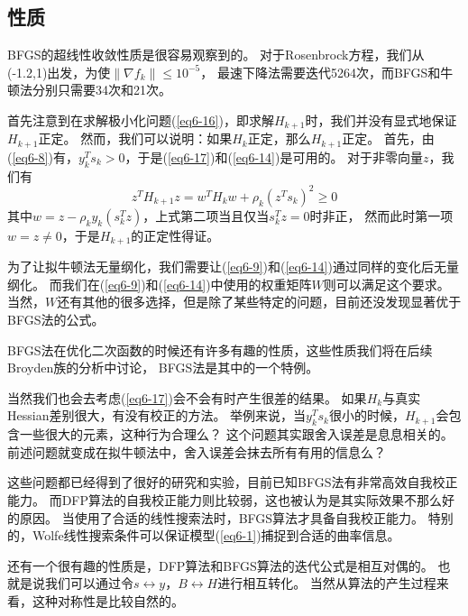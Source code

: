 \documentclass{article}
\begin{document}
\subsection{性质}
BFGS的超线性收敛性质是很容易观察到的。
对于Rosenbrock方程，我们从(-1.2,1)出发，为使$\|\nabla f_k \|\le 10^{-5}$，
最速下降法需要迭代5264次，而BFGS和牛顿法分别只需要34次和21次。

首先注意到在求解极小化问题(\ref{eq6-16})，即求解$H_{k+1}$时，我们并没有显式地保证$H_{k+1}$正定。
然而，我们可以说明：如果$H_k$正定，那么$H_{k+1}$正定。
首先，由(\ref{eq6-8})有，$y_k^Ts_k>0$，于是(\ref{eq6-17})和(\ref{eq6-14})是可用的。
对于非零向量$z$，我们有
\[
  z^TH_{k+1}z = w^T H_k w + \rho_k(z^Ts_k)^2 \ge 0
\]
其中$w = z - \rho_ky_k(s_k^Tz)$，上式第二项当且仅当$s_k^Tz = 0$时非正，
然而此时第一项$w = z \ne 0$，于是$H_{k+1}$的正定性得证。

为了让拟牛顿法无量纲化，我们需要让(\ref{eq6-9})和(\ref{eq6-14})通过同样的变化后无量纲化。
而我们在(\ref{eq6-9})和(\ref{eq6-14})中使用的权重矩阵$W$则可以满足这个要求。
当然，$W$还有其他的很多选择，但是除了某些特定的问题，目前还没发现显著优于BFGS法的公式。

BFGS法在优化二次函数的时候还有许多有趣的性质，这些性质我们将在后续Broyden族的分析中讨论，
BFGS法是其中的一个特例。

当然我们也会去考虑(\ref{eq6-17})会不会有时产生很差的结果。
如果$H_k$与真实Hessian差别很大，有没有校正的方法。
举例来说，当$y_k^Ts_k$很小的时候，$H_{k+1}$会包含一些很大的元素，这种行为合理么？
这个问题其实跟舍入误差是息息相关的。
前述问题就变成在拟牛顿法中，舍入误差会抹去所有有用的信息么？

这些问题都已经得到了很好的研究和实验，目前已知BFGS法有非常高效自我校正能力。
而DFP算法的自我校正能力则比较弱，这也被认为是其实际效果不那么好的原因。
当使用了合适的线性搜索法时，BFGS算法才具备自我校正能力。
特别的，Wolfe线性搜索条件可以保证模型(\ref{eq6-1})捕捉到合适的曲率信息。

还有一个很有趣的性质是，DFP算法和BFGS算法的迭代公式是相互对偶的。
也就是说我们可以通过令$s\leftrightarrow y$，$B\leftrightarrow H$进行相互转化。
当然从算法的产生过程来看，这种对称性是比较自然的。
\end{document}
